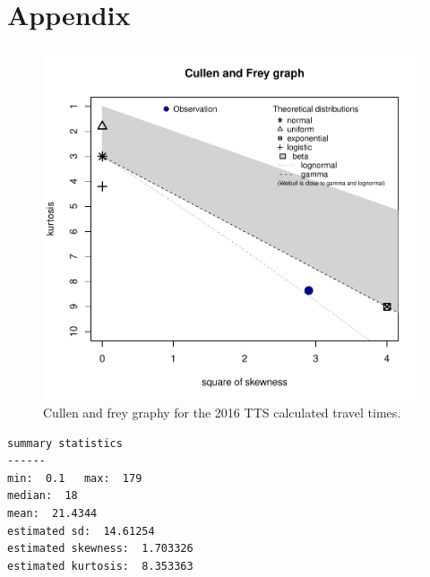 \documentclass[Royal,times,sageh]{sagej}
\begin{document}
\hypertarget{appendix}{%
\section{Appendix}\label{appendix}}

\begin{figure}
\includegraphics[width=1\linewidth]{Manuscript-Data-Package_files/figure-latex/plot-cullen-frey-1} \caption{\label{fig:plot-cullen-frey}Cullen and frey graphy for the 2016 TTS calculated travel times.}\label{fig:plot-cullen-frey}
\end{figure}

\begin{verbatim}
summary statistics
------
min:  0.1   max:  179 
median:  18 
mean:  21.4344 
estimated sd:  14.61254 
estimated skewness:  1.703326 
estimated kurtosis:  8.353363 
\end{verbatim}

\newpage



\end{document}
